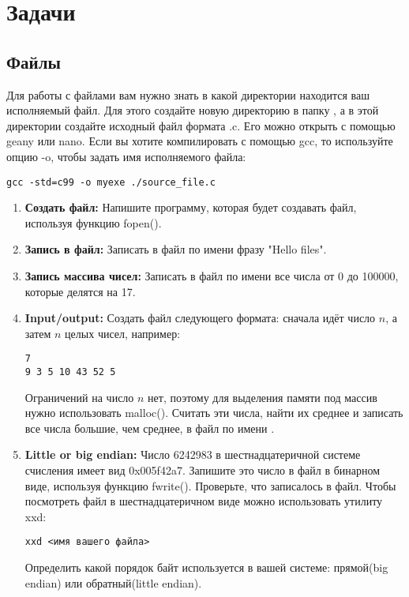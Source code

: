 \documentclass{article}
\begin{document}
\newpage
\section*{Задачи}
\subsection*{Файлы}
Для работы с файлами вам нужно знать в какой директории находится ваш исполняемый файл. Для этого создайте новую директорию в папку , а в этой директории создайте исходный файл формата .c. Его можно открыть с помощью geany или nano. Если вы хотите компилировать с помощью gcc, то используйте опцию -o, чтобы задать имя исполняемого файла: 
\begin{verbatim}
gcc -std=c99 -o myexe ./source_file.c
\end{verbatim}
\begin{enumerate}
\item \textbf{Создать файл:} Напишите программу, которая будет создавать файл, используя функцию fopen().
\item \textbf{Запись в файл:} Записать в файл по имени  фразу "Hello files".
\item \textbf{Запись массива чисел:} Записать в файл по имени  все числа от 0 до 100000, которые делятся на 17.
\item \textbf{Input/output:} Создать файл  следующего формата: сначала идёт число $n$, а затем $n$ целых чисел, например:
\begin{verbatim}
7
9 3 5 10 43 52 5
\end{verbatim}
Ограничений на число $n$ нет, поэтому для выделения памяти под массив нужно использовать malloc(). Считать эти числа, найти их среднее и записать все числа большие, чем среднее, в файл по имени .
\item \textbf{Little or big endian:} Число 6242983 в шестнадцатеричной системе счисления имеет вид 0x005f42a7. Запишите это число в файл в бинарном виде, используя функцию fwrite(). Проверьте, что записалось в файл. Чтобы посмотреть файл в шестнадцатеричном виде можно использовать утилиту xxd:
\begin{verbatim}
xxd <имя вашего файла>
\end{verbatim}
Определить какой порядок байт используется в вашей системе: прямой(big endian) или обратный(little endian).
\end{enumerate}
\end{document}
